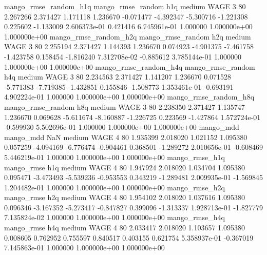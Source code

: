 mango_rmse_random_h1q mango_rmse_random                  h1q     medium     WAGE                 3 80  2.267266       2.371427 1.171118       1.236670   -0.071477     -4.392347     -5.300716    -1.221308       0.225602 -1.133009 2.606373e-01     0.421416   6.745961e-01            1.000000    1.000000e+00        1.000000e+00
mango_rmse_random_h2q mango_rmse_random                  h2q     medium     WAGE                 3 80  2.255194       2.371427 1.144393       1.236670    0.074923     -4.901375     -7.461758    -1.423758       0.158454 -1.816240 7.312708e-02    -0.885612   3.785144e-01            1.000000    1.000000e+00        1.000000e+00
mango_rmse_random_h4q mango_rmse_random                  h4q     medium     WAGE                 3 80  2.234563       2.371427 1.141207       1.236670    0.071528     -5.771383     -7.719385    -1.432851       0.155846 -1.508773 1.353461e-01    -0.693191   4.902224e-01            1.000000    1.000000e+00        1.000000e+00
mango_rmse_random_h8q mango_rmse_random                  h8q     medium     WAGE                 3 80  2.238350       2.371427 1.135747       1.236670    0.069628     -5.611674     -8.160887    -1.226725       0.223569 -1.427864 1.572724e-01    -0.599930   5.502696e-01            1.000000    1.000000e+00        1.000000e+00
            mango_mdd         mango_mdd                  NaN     medium     WAGE                 4 80  1.935399       2.018020 1.021152       1.095380    0.057259     -4.094169     -6.776474    -0.904461       0.368501 -1.289272 2.010656e-01    -0.608469   5.446219e-01            1.000000    1.000000e+00        1.000000e+00
       mango_rmse_h1q        mango_rmse                  h1q     medium     WAGE                 4 80  1.947924       2.018020 1.034704       1.095380    0.095471     -3.473493     -5.539236    -0.953553       0.343219 -1.289481 2.009935e-01    -1.569845   1.204482e-01            1.000000    1.000000e+00        1.000000e+00
       mango_rmse_h2q        mango_rmse                  h2q     medium     WAGE                 4 80  1.954102       2.018020 1.037616       1.095380    0.096346     -3.167352     -5.273417    -0.847827       0.399096 -1.313337 1.928713e-01    -1.827779   7.135824e-02            1.000000    1.000000e+00        1.000000e+00
       mango_rmse_h4q        mango_rmse                  h4q     medium     WAGE                 4 80  2.033417       2.018020 1.103657       1.095380    0.008605      0.762952      0.755597     0.840517       0.403155  0.621754 5.358937e-01    -0.367019   7.145863e-01            1.000000    1.000000e+00        1.000000e+00
